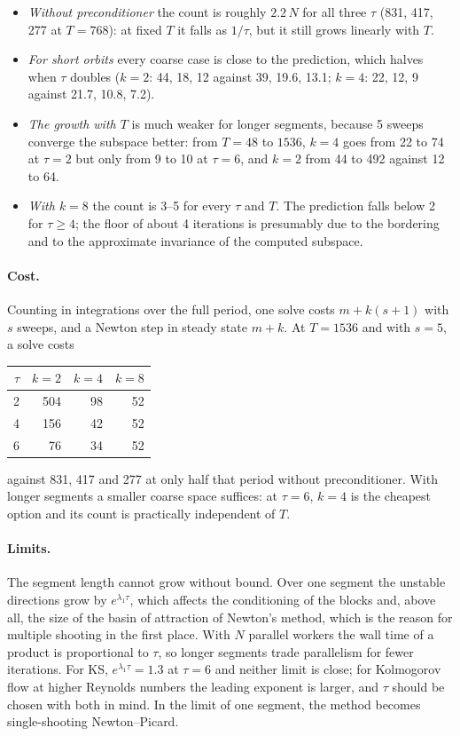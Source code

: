 \documentclass[11pt,a4paper]{article}
\begin{document}
\begin{itemize}
\item \emph{Without preconditioner} the count is roughly $2.2\,N$ for all three $\tau$ (831, 417, 277 at $T = 768$): at fixed $T$ it falls as $1/\tau$, but it still grows linearly with $T$.
\item \emph{For short orbits} every coarse case is close to the prediction, which halves when $\tau$ doubles ($k = 2$: 44, 18, 12 against 39, 19.6, 13.1; $k = 4$: 22, 12, 9 against 21.7, 10.8, 7.2).
\item \emph{The growth with $T$} is much weaker for longer segments, because 5 sweeps converge the subspace better: from $T = 48$ to $1536$, $k = 4$ goes from 22 to 74 at $\tau = 2$ but only from 9 to 10 at $\tau = 6$, and $k = 2$ from 44 to 492 against 12 to 64.
\item \emph{With $k = 8$} the count is 3--5 for every $\tau$ and $T$. The prediction falls below 2 for $\tau \ge 4$; the floor of about 4 iterations is presumably due to the bordering and to the approximate invariance of the computed subspace.
\end{itemize}

\paragraph{Cost.} Counting in integrations over the full period, one solve costs $m + k(s+1)$ with $s$ sweeps, and a Newton step in steady state $m + k$. At $T = 1536$ and with $s = 5$, a solve costs
\begin{center}
\begin{tabular}{rrrr}
\toprule
$\tau$ & $k = 2$ & $k = 4$ & $k = 8$\\
\midrule
2 & 504 & 98 & 52\\
4 & 156 & 42 & 52\\
6 & 76 & 34 & 52\\
\bottomrule
\end{tabular}
\end{center}
against 831, 417 and 277 at only half that period without preconditioner. With longer segments a smaller coarse space suffices: at $\tau = 6$, $k = 4$ is the cheapest option and its count is practically independent of $T$.

\paragraph{Limits.} The segment length cannot grow without bound. Over one segment the unstable directions grow by $e^{\lambda_1\tau}$, which affects the conditioning of the blocks and, above all, the size of the basin of attraction of Newton's method, which is the reason for multiple shooting in the first place. With $N$ parallel workers the wall time of a product is proportional to $\tau$, so longer segments trade parallelism for fewer iterations. For KS, $e^{\lambda_1\tau} = 1.3$ at $\tau = 6$ and neither limit is close; for Kolmogorov flow at higher Reynolds numbers the leading exponent is larger, and $\tau$ should be chosen with both in mind. In the limit of one segment, the method becomes single-shooting Newton--Picard.
\end{document}
